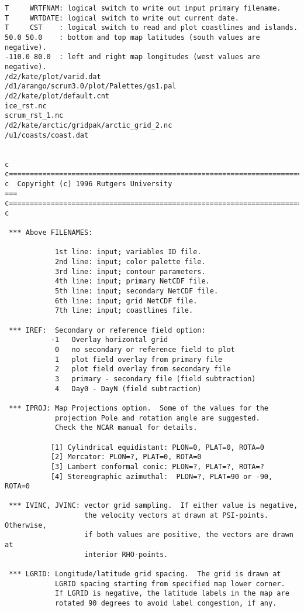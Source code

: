 \begin{verbatim}
T     WRTFNAM: logical switch to write out input primary filename.
T     WRTDATE: logical switch to write out current date.
T     CST    : logical switch to read and plot coastlines and islands.
50.0 50.0    : bottom and top map latitudes (south values are negative).
-110.0 80.0  : left and right map longitudes (west values are negative).
/d2/kate/plot/varid.dat
/d1/arango/scrum3.0/plot/Palettes/gs1.pal
/d2/kate/plot/default.cnt
ice_rst.nc
scrum_rst_1.nc
/d2/kate/arctic/gridpak/arctic_grid_2.nc
/u1/coasts/coast.dat


c
c=======================================================================
c  Copyright (c) 1996 Rutgers University                             ===
c=======================================================================
c

 *** Above FILENAMES:

            1st line: input; variables ID file.
            2nd line: input; color palette file.
            3rd line: input; contour parameters.
            4th line: input; primary NetCDF file.
            5th line: input; secondary NetCDF file.
            6th line: input; grid NetCDF file.
            7th line: input; coastlines file.

 *** IREF:  Secondary or reference field option:
           -1   Overlay horizontal grid
            0   no secondary or reference field to plot
            1   plot field overlay from primary file
            2   plot field overlay from secondary file
            3   primary - secondary file (field subtraction)
            4   Day0 - DayN (field subtraction)

 *** IPROJ: Map Projections option.  Some of the values for the
            projection Pole and rotation angle are suggested.
            Check the NCAR manual for details.

           [1] Cylindrical equidistant: PLON=0, PLAT=0, ROTA=0
           [2] Mercator: PLON=?, PLAT=0, ROTA=0
           [3] Lambert conformal conic: PLON=?, PLAT=?, ROTA=?
           [4] Stereographic azimuthal:  PLON=?, PLAT=90 or -90, ROTA=0

 *** IVINC, JVINC: vector grid sampling.  If either value is negative,
                   the velocity vectors at drawn at PSI-points.  Otherwise,
                   if both values are positive, the vectors are drawn at
                   interior RHO-points.

 *** LGRID: Longitude/latitude grid spacing.  The grid is drawn at
            LGRID spacing starting from specified map lower corner.
            If LGRID is negative, the latitude labels in the map are
            rotated 90 degrees to avoid label congestion, if any.


\end{verbatim}
